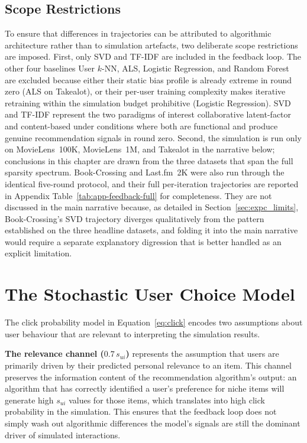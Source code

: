 \documentclass[11pt,a4paper]{report}
\begin{document}
\subsection{Scope Restrictions}

To ensure that differences in trajectories can be attributed to algorithmic architecture rather than to simulation artefacts, two deliberate scope restrictions are imposed. First, only SVD and TF-IDF are included in the feedback loop. The other four baselines User $k$-NN, ALS, Logistic Regression, and Random Forest are excluded because either their static bias profile is already extreme in round zero (ALS on Takealot), or their per-user training complexity makes iterative retraining within the simulation budget prohibitive (Logistic Regression). SVD and TF-IDF represent the two paradigms of interest collaborative latent-factor and content-based under conditions where both are functional and produce genuine recommendation signals in round zero. Second, the simulation is run only on MovieLens~100K, MovieLens~1M, and Takealot in the narrative below; conclusions in this chapter are drawn from the three datasets that span the full sparsity spectrum. Book-Crossing and Last.fm~2K were also run through the identical five-round protocol, and their full per-iteration trajectories are reported in Appendix Table~\ref{tab:app-feedback-full} for completeness. They are not discussed in the main narrative because, as detailed in Section~\ref{sec:expc_limits}, Book-Crossing's SVD trajectory diverges qualitatively from the pattern established on the three headline datasets, and folding it into the main narrative would require a separate explanatory digression that is better handled as an explicit limitation.

\section{The Stochastic User Choice Model}
\label{sec:expc_click}

The click probability model in Equation~\ref{eq:click} encodes two assumptions about user behaviour that are relevant to interpreting the simulation results.

\textbf{The relevance channel ($0.7\, s_{ui}$)} represents the assumption that users are primarily driven by their predicted personal relevance to an item. This channel preserves the information content of the recommendation algorithm's output: an algorithm that has correctly identified a user's preference for niche items will generate high $s_{ui}$ values for those items, which translates into high click probability in the simulation. This ensures that the feedback loop does not simply wash out algorithmic differences the model's signals are still the dominant driver of simulated interactions.
\end{document}
